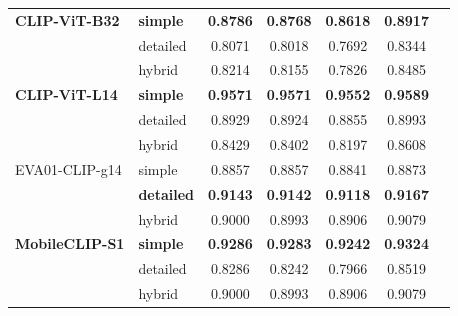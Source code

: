 \documentclass[hidelinks, 11pt]{article}
\begin{document}
\begin{longtable}{@{}llccccc@{}}
\textbf{CLIP-ViT-B32}   & \textbf{simple}   & \textbf{0.8786} & \textbf{0.8768} & \textbf{0.8618} & \textbf{0.8917} \\
                        & detailed          & 0.8071          & 0.8018          & 0.7692          & 0.8344          \\
                        & hybrid            & 0.8214          & 0.8155          & 0.7826          & 0.8485          \\
\addlinespace
\textbf{CLIP-ViT-L14}   & \textbf{simple}   & \textbf{0.9571} & \textbf{0.9571} & \textbf{0.9552} & \textbf{0.9589} \\
                        & detailed          & 0.8929          & 0.8924          & 0.8855          & 0.8993          \\
                        & hybrid            & 0.8429          & 0.8402          & 0.8197          & 0.8608          \\
\addlinespace
EVA01-CLIP-g14          & simple            & 0.8857          & 0.8857          & 0.8841          & 0.8873          \\
\textbf{}               & \textbf{detailed} & \textbf{0.9143} & \textbf{0.9142} & \textbf{0.9118} & \textbf{0.9167} \\
                        & hybrid            & 0.9000          & 0.8993          & 0.8906          & 0.9079          \\
\addlinespace
\textbf{MobileCLIP-S1}  & \textbf{simple}   & \textbf{0.9286} & \textbf{0.9283} & \textbf{0.9242} & \textbf{0.9324} \\
                        & detailed          & 0.8286          & 0.8242          & 0.7966          & 0.8519          \\
                        & hybrid            & 0.9000          & 0.8993          & 0.8906          & 0.9079          \\

\end{longtable}
\end{document}
